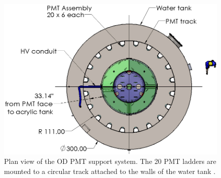 \begin{figure}[!ht]
    \centering
    \includegraphics[width=0.7\linewidth]{figures/LZ/OD_PMT_support.jpg}
    \caption[Plan view of the OD PMT support system.]{Plan view of the OD PMT support system. The 20 PMT ladders are mounted to a circular track attached to the walls of the water tank \cite{LZTDR}.}
    \label{fig:LZ/ODPMT_Array}
\end{figure}
